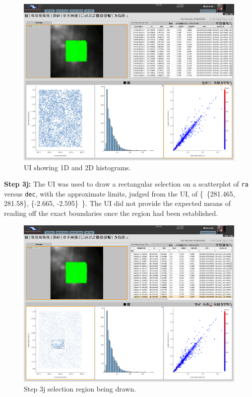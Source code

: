 \begin{figure}
  \includegraphics[width=\linewidth]{lsp-00-20/step3-i.png}
  \caption{UI showing 1D and 2D histograms.}
  \label{fig:lsp-00-20-2Dhist}
\end{figure}

\textbf{Step 3j:} The UI was used to draw a rectangular selection on a scatterplot of \verb|ra| versus \verb|dec|,
with the approximate limits, judged from the UI, of \{~\{281.465, 281.58\}, \{-2.665, -2.595\}~\}.
The UI did not provide the expected means of reading off the exact boundaries once the region had been established.

\begin{figure}
  \includegraphics[width=\linewidth]{lsp-00-20/step3-j.png}
  \caption{Step 3j selection region being drawn.}
  \label{fig:lsp-00-20-rect-selecting}
\end{figure}

